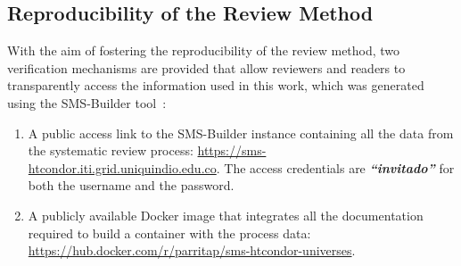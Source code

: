 \subsection{Reproducibility of the Review Method}
\label{sec:reproducibilidad}

With the aim of fostering the reproducibility of the review method, two verification mechanisms are provided that allow reviewers and readers to transparently access the information used in this work, which was generated using the SMS-Builder tool~\cite{sms-builder-repo}: \\

\begin{enumerate}[label=\Roman*)]
	\item A public access link to the SMS-Builder instance containing all the data from the systematic review process: \url{https://sms-htcondor.iti.grid.uniquindio.edu.co}. The access credentials are \hbox{\textbf{\textit{``invitado''}}} for both the username and the password.
	\item A publicly available Docker image that integrates all the documentation required to build a container with the process data: \url{https://hub.docker.com/r/parritap/sms-htcondor-universes}.
\end{enumerate}